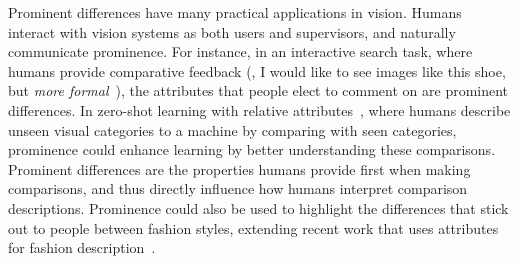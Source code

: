 \documentclass[10pt,twocolumn,letterpaper]{article}
\begin{document}
Prominent differences have many practical applications in vision. Humans interact with vision systems as both users and supervisors, and naturally communicate prominence. For instance, in an interactive search task, where humans provide comparative feedback (\eg, I would like to see images like this shoe, but \textit{more formal}~\cite{whittlesearch}), the attributes that people elect to comment on are prominent differences. In zero-shot learning with relative attributes~\cite{zeroshot,relativeattributes}, where humans describe unseen visual categories to a machine by comparing with seen categories, prominence could enhance learning by better understanding these comparisons. Prominent differences are the properties humans provide first when making comparisons, and thus directly influence how humans interpret comparison descriptions. Prominence could also be used to highlight the differences that stick out to people between fashion styles, extending recent work that uses attributes for fashion description~\cite{forecastingfashion, deepfashion,unsupervisedfashion}. 
\end{document}
